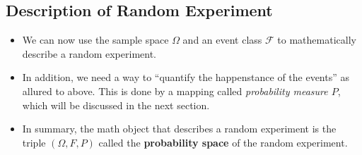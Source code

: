 \subsection{Description of Random Experiment}
\begin{itemize}
\item We can now use the sample space \(\Omega\) and an event class \(\mathcal{F}\) to
    mathematically describe a random experiment. 
\item In addition, we need a way to ``quantify the happenstance of the
  events'' as allured to above. This is done by a mapping called
  \emph{probability measure \(P\)}, which will be discussed in the next section.
\item In summary, the math object that describes a random experiment is
  the triple \((\Omega, F, P)\) called the \textbf{probability space}
  of the random experiment.
\end{itemize}

